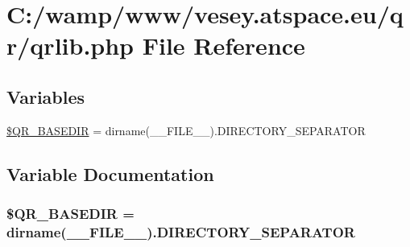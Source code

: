 \hypertarget{qrlib_8php}{\section{C\-:/wamp/www/vesey.atspace.\-eu/qr/qrlib.php File Reference}
\label{qrlib_8php}
}
\subsection*{Variables}
\begin{DoxyCompactItemize}
\item 
\hyperlink{qrlib_8php_a2b9a0b4d98e1e23a5460e3639fdae91b}{\$\-Q\-R\-\_\-\-B\-A\-S\-E\-D\-I\-R} = dirname(\-\_\-\-\_\-\-F\-I\-L\-E\-\_\-\-\_\-).D\-I\-R\-E\-C\-T\-O\-R\-Y\-\_\-\-S\-E\-P\-A\-R\-A\-T\-O\-R
\end{DoxyCompactItemize}


\subsection{Variable Documentation}
\hypertarget{qrlib_8php_a2b9a0b4d98e1e23a5460e3639fdae91b}{
\subsubsection[{\$\-Q\-R\-\_\-\-B\-A\-S\-E\-D\-I\-R}]{\setlength{\rightskip}{0pt plus 5cm}\$Q\-R\-\_\-\-B\-A\-S\-E\-D\-I\-R = dirname(\-\_\-\-\_\-\-F\-I\-L\-E\-\_\-\-\_\-).D\-I\-R\-E\-C\-T\-O\-R\-Y\-\_\-\-S\-E\-P\-A\-R\-A\-T\-O\-R}}\label{qrlib_8php_a2b9a0b4d98e1e23a5460e3639fdae91b}
